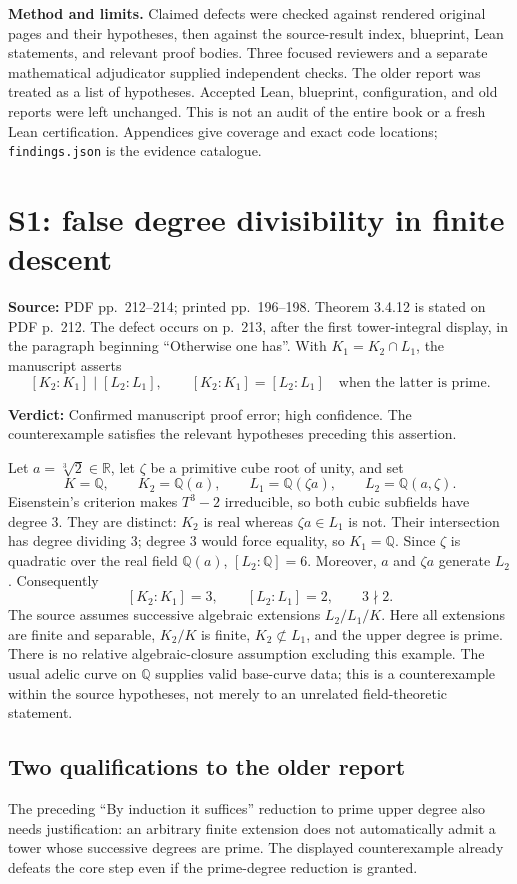 \documentclass[11pt,a4paper]{article}
\newcommand{\Q}{\mathbb Q}
\newcommand{\R}{\mathbb R}
\newcommand{\code}[1]{{\small\nolinkurl{#1}}}
\newcommand{\loc}[2]{\par\noindent\textbf{Source:} PDF pp.~#1; printed pp.~#2.}
\newcommand{\verdict}[1]{\par\noindent\textbf{Verdict:} #1\par}
\begin{document}
\noindent\textbf{Method and limits.}
Claimed defects were checked against rendered original pages and their hypotheses, then against the source-result index, blueprint, Lean statements, and relevant proof bodies. Three focused reviewers and a separate mathematical adjudicator supplied independent checks. The older report was treated as a list of hypotheses. Accepted Lean, blueprint, configuration, and old reports were left unchanged. This is not an audit of the entire book or a fresh Lean certification. Appendices give coverage and exact code locations; \code{findings.json} is the evidence catalogue.

\clearpage
\section{S1: false degree divisibility in finite descent}\label{s1}
\loc{212--214}{196--198}
Theorem 3.4.12 is stated on PDF p.~212. The defect occurs on p.~213, after the first tower-integral display, in the paragraph beginning “Otherwise one has”. With $K_1=K_2\cap L_1$, the manuscript asserts
\[
 [K_2:K_1]\mid[L_2:L_1],\qquad
 [K_2:K_1]=[L_2:L_1]\quad\text{when the latter is prime}.
\]
\verdict{Confirmed manuscript proof error; high confidence. The counterexample satisfies the relevant hypotheses preceding this assertion.}

Let $a=\sqrt[3]{2}\in\R$, let $\zeta$ be a primitive cube root of unity, and set
\[
 K=\Q,\qquad K_2=\Q(a),\qquad L_1=\Q(\zeta a),\qquad L_2=\Q(a,\zeta).
\]
Eisenstein's criterion makes $T^3-2$ irreducible, so both cubic subfields have degree 3. They are distinct: $K_2$ is real whereas $\zeta a\in L_1$ is not. Their intersection has degree dividing 3; degree 3 would force equality, so $K_1=\Q$. Since $\zeta$ is quadratic over the real field $\Q(a)$, $[L_2:\Q]=6$. Moreover, $a$ and $\zeta a$ generate $L_2$. Consequently
\[
 [K_2:K_1]=3,\qquad [L_2:L_1]=2,\qquad 3\nmid2.
\]
The source assumes successive algebraic extensions $L_2/L_1/K$. Here all extensions are finite and separable, $K_2/K$ is finite, $K_2\not\subset L_1$, and the upper degree is prime. There is no relative algebraic-closure assumption excluding this example. The usual adelic curve on $\Q$ supplies valid base-curve data; this is a counterexample within the source hypotheses, not merely to an unrelated field-theoretic statement.

\subsection{Two qualifications to the older report}
The preceding “By induction it suffices” reduction to prime upper degree also needs justification: an arbitrary finite extension does not automatically admit a tower whose successive degrees are prime. The displayed counterexample already defeats the core step even if the prime-degree reduction is granted.
\end{document}
